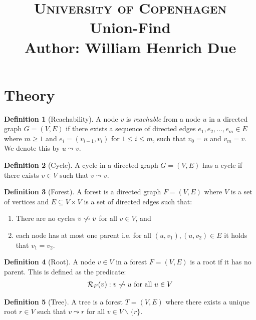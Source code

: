 \documentclass[a4paper,12pt]{article}
\title{
    {\Large \textsc{University of Copenhagen}} \\[5pt]
    {\large Union-Find} \\[10pt]
    Author: William Henrich Due \\[0pt]
}
\author{}
\date{}
\theoremstyle{definition}
\newtheorem{definition}{Definition}[section]
\begin{document}
\maketitle
\thispagestyle{firstpage}

\section{Theory}
\begin{definition}[Reachability]
    A node $v$ is \emph{reachable} from a node $u$ in a directed graph $G = (V,
    E)$ if there exists a sequence of directed edges $e_1, e_2, \ldots, e_m \in
    E$ where $m \geq 1$ and $e_i = (v_{i-1}, v_i)$ for $1 \leq i \leq m$,
    such that $v_0 = u$ and $v_m = v$. We denote this by $u \leadsto v$.
\end{definition}

\begin{definition}[Cycle]
    A cycle in a directed graph $G = (V, E)$ has a cycle if there exists
    $v \in V$ such that $v \leadsto v$.
\end{definition}

\begin{definition}[Forest]
    A forest is a directed graph $F = (V, E)$ where $V$ is a set of vertices and $E
    \subseteq V \times V$ is a set of directed edges such that:
    \begin{enumerate}
        \item There are no cycles $v \centernot\leadsto v$ for all $v \in V$, and
        \item each node has at most one parent i.e. for all $(u, v_1), (u, v_2)
        \in E$ it holds that $v_1 = v_2$.
    \end{enumerate}
\end{definition}

\begin{definition}[Root]
    A node $v \in V$ in a forest $F = (V, E)$ is a root if it has no parent.
    This is defined as the predicate:
    \begin{align*}
        \mathcal{R}_F(v) : v \centernot\leadsto u \text{ for all } u \in V
    \end{align*}
\end{definition}

\begin{definition}[Tree]
    A tree is a forest $T = (V, E)$ where there exists a unique root $r \in V$
    such that $v \leadsto r$ for all $v \in V\backslash
    \{r\}$.
\end{definition}
\end{document}
